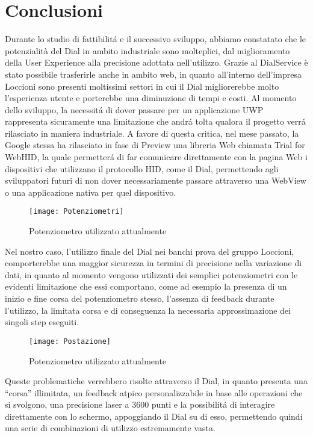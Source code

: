 \chapter{Conclusioni}
\label{chap:Capitolo1}

Durante lo studio di fattibilitá e il successivo sviluppo, abbiamo constatato che le potenzialità del Dial in ambito industriale sono molteplici, dal miglioramento della User Experience alla precisione adottata nell’utilizzo.
Grazie al DialService è stato possibile trasferirle anche in ambito web, in quanto all’interno dell’impresa Loccioni sono presenti moltissimi settori in cui il Dial migliorerebbe molto l’esperienza utente e porterebbe una diminuzione di tempi e costi.
Al momento dello sviluppo, la necessitá di dover passare per un applicazione UWP rappresenta sicuramente una limitazione che andrá tolta qualora il progetto verrá rilasciato in maniera industriale.
A favore di questa critica, nel mese passato, la Google stessa ha rilasciato in fase di Preview una libreria Web chiamata Trial for WebHID, la quale permetterá di far comunicare direttamente con la pagina Web i dispositivi che utilizzano il protocollo HID, come il Dial, permettendo agli sviluppatori futuri di non dover necessariamente passare attraverso una WebView o una applicazione nativa per quel dispositivo.

\begin{figure}[htpb!]
  \centering
  \texttt{[image: Potenziometri]}
  \caption{Potenziometro utilizzato attualmente}
\end{figure}
Nel nostro caso, l’utilizzo finale del Dial nei banchi prova del gruppo Loccioni, comporterebbe una maggior sicurezza in termini di precisione nella variazione di dati, in quanto al momento vengono utilizzati dei semplici potenziometri con le evidenti limitazione che essi comportano, come ad esempio la presenza di un inizio e fine corsa del potenziometro stesso, l’assenza di feedback durante l’utilizzo, la limitata corsa e di conseguenza la necessaria approssimazione dei singoli step eseguiti.

\begin{figure}[htpb!]
  \centering
  \texttt{[image: Postazione]}
  \caption{Potenziometro utilizzato attualmente}
\end{figure}

Queste problematiche verrebbero risolte attraverso il Dial, in quanto presenta una “corsa” illimitata, un feedback atpico personalizzabile in base alle operazioni che si svolgono, una precisione laser a 3600 punti e la possibilitá di interagire direttamente con lo schermo, appoggiando il Dial su di esso, permettendo quindi una serie di combinazioni di utilizzo estremamente vasta.